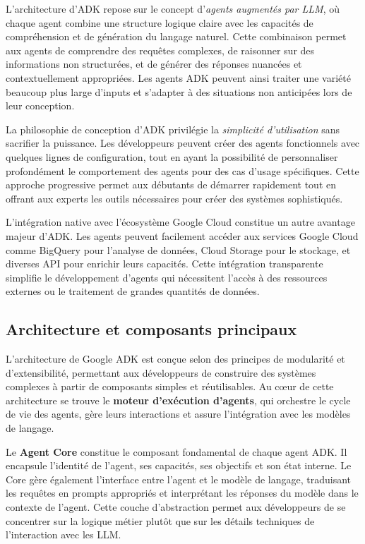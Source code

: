 L'architecture d'ADK repose sur le concept d'\emph{agents augmentés par LLM}, où chaque agent combine une structure logique claire avec les capacités de compréhension et de génération du langage naturel. Cette combinaison permet aux agents de comprendre des requêtes complexes, de raisonner sur des informations non structurées, et de générer des réponses nuancées et contextuellement appropriées. Les agents ADK peuvent ainsi traiter une variété beaucoup plus large d'inputs et s'adapter à des situations non anticipées lors de leur conception.

La philosophie de conception d'ADK privilégie la \emph{simplicité d'utilisation} sans sacrifier la puissance. Les développeurs peuvent créer des agents fonctionnels avec quelques lignes de configuration, tout en ayant la possibilité de personnaliser profondément le comportement des agents pour des cas d'usage spécifiques. Cette approche progressive permet aux débutants de démarrer rapidement tout en offrant aux experts les outils nécessaires pour créer des systèmes sophistiqués.

L'intégration native avec l'écosystème Google Cloud constitue un autre avantage majeur d'ADK. Les agents peuvent facilement accéder aux services Google Cloud comme BigQuery pour l'analyse de données, Cloud Storage pour le stockage, et diverses API pour enrichir leurs capacités. Cette intégration transparente simplifie le développement d'agents qui nécessitent l'accès à des ressources externes ou le traitement de grandes quantités de données.

\subsection{Architecture et composants principaux}

L'architecture de Google ADK est conçue selon des principes de modularité et d'extensibilité, permettant aux développeurs de construire des systèmes complexes à partir de composants simples et réutilisables. Au cœur de cette architecture se trouve le \textbf{moteur d'exécution d'agents}, qui orchestre le cycle de vie des agents, gère leurs interactions et assure l'intégration avec les modèles de langage.

Le \textbf{Agent Core} constitue le composant fondamental de chaque agent ADK. Il encapsule l'identité de l'agent, ses capacités, ses objectifs et son état interne. Le Core gère également l'interface entre l'agent et le modèle de langage, traduisant les requêtes en prompts appropriés et interprétant les réponses du modèle dans le contexte de l'agent. Cette couche d'abstraction permet aux développeurs de se concentrer sur la logique métier plutôt que sur les détails techniques de l'interaction avec les LLM.

